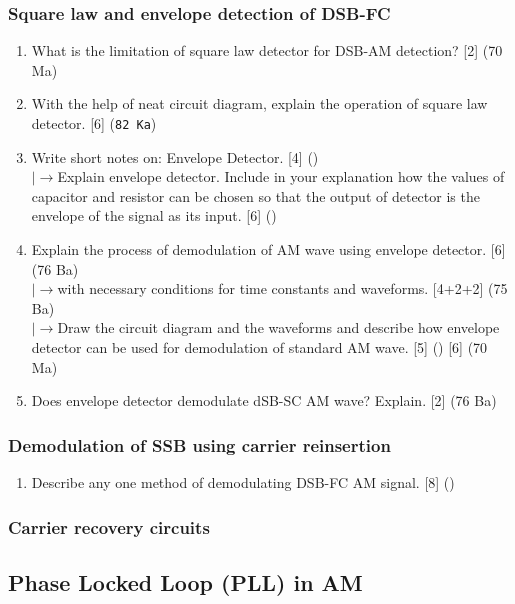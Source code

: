 \documentclass[12pt]{article}
\newcommand{\lb}{\\$\left|\rightarrow\right.$}
\begin{document}
    \subsubsection{Square law and envelope detection of DSB-FC}
      \begin{enumerate}
        \item What is the limitation of square law detector for DSB-AM detection? \hfill [2] (70 Ma)

        \item With the help of neat circuit diagram, explain the operation of square law detector. \hfill [6] (\texttt{82 Ka})

        \item Write short notes on: Envelope Detector. \hfill [4] ()
        \lb Explain envelope detector. Include in your explanation how the values of capacitor and resistor can be chosen so that the output of detector is the envelope of the signal as its input. \hfill [6] ()

        \item Explain the process of demodulation of AM wave using envelope detector. \hfill [6] (76 Ba)
        \lb with necessary conditions for time constants and waveforms. \hfill [4+2+2] (75 Ba)
        \lb Draw the circuit diagram and the waveforms and describe how envelope detector can be used for demodulation of standard AM wave. \hfill [5] () [6] (70 Ma)

        \item Does envelope detector demodulate dSB-SC AM wave? Explain. \hfill [2] (76 Ba)
      \end{enumerate}

    \subsubsection{Demodulation of SSB using carrier reinsertion}
      \begin{enumerate}
        \item Describe any one method of demodulating DSB-FC AM signal. \hfill [8] ()
      \end{enumerate}

    \subsubsection{Carrier recovery circuits}
  \subsection{Phase Locked Loop (PLL) in AM}
\end{document}
